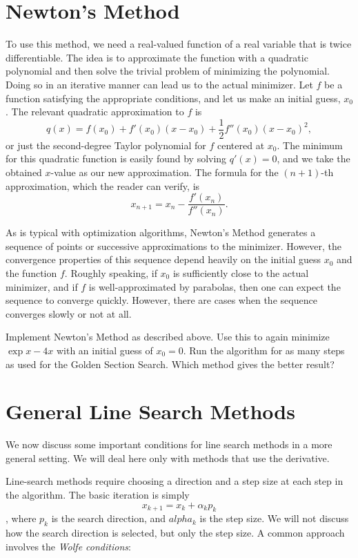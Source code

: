 \section{Newton's Method}
To use this method, we need a real-valued function of a real variable that is twice differentiable. The idea is to approximate the function with a quadratic polynomial and then solve the trivial problem of minimizing the polynomial. Doing so in an iterative manner can lead us to the actual minimizer. Let $f$ be a function satisfying the appropriate conditions, and let us make an initial guess, $x_0$. The relevant quadratic approximation to $f$ is $$q(x) = f(x_0) + f'(x_0)(x-x_0) + \frac{1}{2}f''(x_0)(x-x_0)^2,$$ or just the second-degree Taylor polynomial for $f$ centered at $x_0$. The minimum for this quadratic function is easily found by solving $q'(x) = 0$, and we take the obtained $x$-value as our new approximation. The formula for the $(n+1)$-th approximation, which the reader can verify, is $$x_{n+1} = x_n - \frac{f'(x_n)}{f''(x_n)}.$$

As is typical with optimization algorithms, Newton's Method generates a sequence of points or successive approximations to the minimizer. However, the convergence properties of this sequence depend heavily on the initial guess $x_0$ and the function $f$. Roughly speaking, if $x_0$ is sufficiently close to the actual minimizer, and if $f$ is well-approximated by parabolas, then one can expect the sequence to converge quickly. However, there are cases when the sequence converges slowly or not at all.

\begin{problem}
Implement Newton's Method as described above. Use this to again minimize $\exp{x} - 4x$ with an initial guess of $x_0 = 0$. Run the algorithm for as many steps as used for the Golden Section Search. Which method gives the better result?
\end{problem}

\section*{General Line Search Methods}
We now discuss some important conditions for line search methods in a more general setting. We will deal here only with methods that use the derivative.

Line-search methods require choosing a direction and a step size at each step in the algorithm. The basic iteration is simply $$x_{k+1} = x_k + \alpha_kp_k$$, where $p_k$ is the search direction, and $alpha_k$ is the step size. We will not discuss how the search direction is selected, but only the step size. A common approach involves the \emph{Wolfe conditions}:

